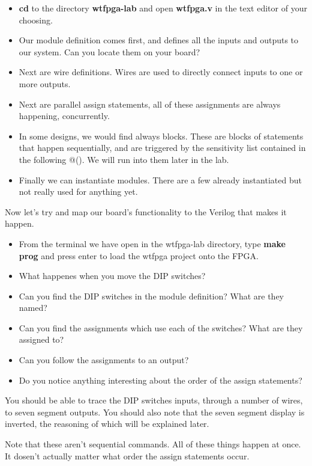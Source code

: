 \documentclass[12pt,a4paper]{article}
\begin{document}
\begin{itemize}
	\item \textbf{cd} to the directory \textbf{wtfpga-lab} and open \textbf{wtfpga.v} in the text editor of your choosing.
	\item Our module definition comes first, and defines all the inputs and outputs to our system. Can you locate them on your board?
	\item Next are wire definitions. Wires are used to	directly connect inputs to one or more outputs.
	\item Next are parallel assign statements, all of these assignments are always happening, concurrently. 
	\item In some designs, we would find always blocks. These are blocks of statements that happen sequentially, and are triggered by the sensitivity list contained in the following @(). We will run into them later in the lab.
	\item Finally we can instantiate modules. There are a few already instantiated but not really used for anything yet.
\end{itemize}
\noindent
Now let’s try and map our board’s functionality to the Verilog that makes it happen.
\begin{itemize}
	\item From the terminal we have open in the wtfpga-lab directory, type \textbf{make prog} and press enter to load the wtfpga project onto the FPGA. 
	\item What happenes when you move the DIP switches?
	\item Can you find the DIP switches in the module definition? What are they named?
	\item Can you find the assignments which use each of the switches? What are they assigned to?
	\item Can you follow the assignments to an output?
	\item Do you notice anything interesting about the order of the assign statements?
\end{itemize}
\noindent
You should be able to trace the DIP switches inputs, through a number of wires, to seven segment outputs. You should also note that the seven segment display is inverted, the reasoning of which will be explained later. 

Note that these aren't sequential commands. All of these things happen at once. It dosen't actually matter what order the assign statements occur. 
\newpage
\end{document}
